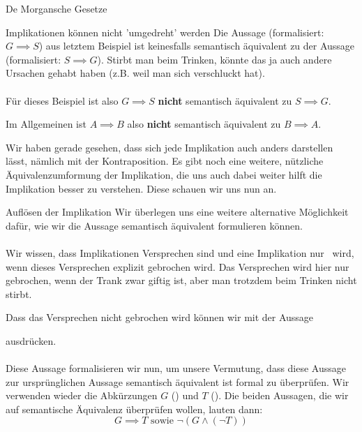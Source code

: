 \documentclass[../../main.tex]{subfiles}
\begin{document}
\begin{lemma}{De Morgansche Gesetze}
    \begin{example}{Implikationen können nicht 'umgedreht' werden}
        Die Aussage  (formalisiert: $G \implies S$) aus letztem Beispiel ist 
        keinesfalls semantisch äquivalent zu der 
        Aussage  (formalisiert: $S \implies G$).
        Stirbt man beim Trinken, könnte das ja auch andere Ursachen gehabt haben (z.B. weil man sich verschluckt hat).
        \\ \\
        Für dieses Beispiel ist also $G \implies S$ \textbf{nicht} semantisch äquivalent zu $S \implies G$.

    \end{example}

    Im Allgemeinen ist $A \implies B$ also \textbf{nicht} semantisch äquivalent zu $B \implies A$.

    Wir haben gerade gesehen, dass sich jede Implikation auch anders darstellen lässt, 
    nämlich mit der Kontraposition. Es gibt noch eine weitere, nützliche Äquivalenzumformung 
    der Implikation, die uns auch dabei weiter hilft die Implikation besser zu verstehen.
    Diese schauen wir uns nun an.
    
    \begin{example}{Auflösen der Implikation}
        Wir überlegen uns eine weitere alternative Möglichkeit dafür, wie wir die Aussage
         semantisch äquivalent formulieren können.
        \\ \\
        Wir wissen, dass Implikationen Versprechen sind und eine Implikation nur \falsch\ wird,
        wenn dieses Versprechen explizit gebrochen wird. Das Versprechen wird hier nur
        gebrochen, wenn der Trank zwar giftig ist, aber man trotzdem beim Trinken nicht stirbt.

        Dass das Versprechen nicht gebrochen wird können wir mit der Aussage
        
        ausdrücken.
        \\ \\
        Diese Aussage formalisieren wir nun, um unsere 
        Vermutung, dass diese Aussage zur ursprünglichen Aussage semantisch
         äquivalent ist formal zu überprüfen.
        Wir verwenden wieder die Abkürzungen $G$ () und
        $T$ (). Die beiden Aussagen, die wir auf semantische 
        Äquivalenz überprüfen wollen, lauten dann:
        \[G \implies T \textrm{ sowie } \lnot (G \land (\lnot T))\]


\end{example}
\end{lemma}
\end{document}
